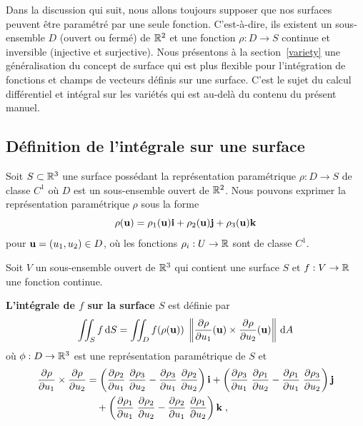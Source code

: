 {Dans la discussion qui suit, nous allons toujours supposer que nos surfaces
peuvent être paramétré par une seule fonction.  C'est-à-dire, ils
existent un sous-ensemble $D$ (ouvert ou fermé) de $\mathbb{R}^2$ et une
fonction $\rho:D \to S$ continue et inversible (injective et
surjective).  Nous présentons à la section~\ref{variety} une généralisation
du concept de surface qui est plus flexible pour l'intégration de
fonctions et champs de vecteurs définis sur une surface.  C'est le
sujet du calcul différentiel et intégral sur les variétés qui est
au-delà du contenu du présent manuel.

\subsection{Définition de l'intégrale sur une surface} 

Soit $S \subset \mathbb{R}^3$ une surface possédant la représentation
paramétrique $\rho:D\rightarrow S$ de classe $C^1$ où $D$ est un
sous-ensemble ouvert de $\mathbb{R}^2$.  Nous pouvons exprimer la représentation
paramétrique $\rho$ sous la forme
\begin{equation} \label{para_surf}
\rho(\mathbf{u}) = \rho_1(\mathbf{u})\mathbf{i} + \rho_2(\mathbf{u})\mathbf{j} + \rho_3(\mathbf{u})\mathbf{k}
\end{equation}
pour $ \mathbf{u} = (u_1,u_2) \in D$, où les fonctions
$\rho_i:U \rightarrow \mathbb{R}$ sont de classe $C^1$.

\begin{defn}
Soit $V$ un sous-ensemble ouvert de $\mathbb{R}^3$ qui contient une surface $S$ et
$f:V\rightarrow \mathbb{R}$ une fonction continue.

{\bfseries L'intégrale de $f$ sur la surface $S$} est définie par
\[
\iint_S  f \,\mathrm{d}S
= \iint_D f(\rho(\mathbf{u}))\;
\left\|\frac{\partial \rho}{\partial u_1}(\mathbf{u}) \times
\frac{\partial \rho}{\partial u_2}(\mathbf{u})\right\| \,\mathrm{d}A
\]
où $\phi:D \to \mathbb{R}^3$ est une représentation paramétrique de $S$ et
\begin{equation*}
\begin{split}
\frac{\partial \rho}{\partial u_1} \times \frac{\partial \rho}{\partial u_2} &
= \left( \frac{\partial \rho_2}{\partial u_1} \; \frac{\partial \rho_3}{\partial u_2} -
\frac{\partial \rho_3}{\partial u_1} \; \frac{\partial \rho_2}{\partial u_2} \right) \mathbf{i} +
\left( \frac{\partial \rho_3}{\partial u_1} \; \frac{\partial \rho_1}{\partial u_2} 
- \frac{\partial \rho_1}{\partial u_1} \; \frac{\partial \rho_3}{\partial u_2} \right) \mathbf{j} \\
&\quad + \left( \frac{\partial \rho_1}{\partial u_1}\; \frac{\partial \rho_2}{\partial u_2}
- \frac{\partial \rho_2}{\partial u_1}\; \frac{\partial \rho_1}{\partial u_2} \right) \mathbf{k} \; ,
\end{split}
\end{equation*}


\end{defn}}
